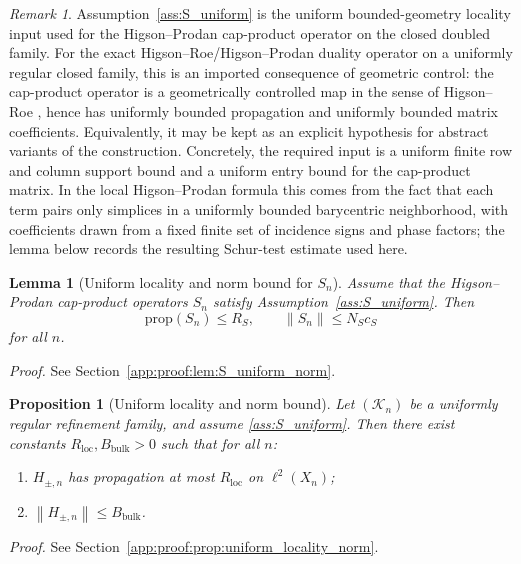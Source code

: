 \documentclass[11pt]{article}
\numberwithin{equation}{section}
\newtheorem{lemma}[theorem]{Lemma}
\newtheorem{proposition}[theorem]{Proposition}
\theoremstyle{definition}
\theoremstyle{remark}
\newtheorem{remark}[theorem]{Remark}
\newcommand{\proofref}[1]{%
  \par\noindent\emph{Proof.} See Section~\ref{#1}.\par\medskip
}
\newcommand{\proofappendixref}[1]{\proofref{#1}}
\newcommand{\K}{\mathcal{K}}
\newcommand{\opnorm}[1]{\left\lVert#1\right\rVert}
\begin{document}
\begin{remark}
Assumption~\ref{ass:S_uniform} is the uniform bounded-geometry locality input used for the
Higson--Prodan cap-product operator on the closed doubled family. For the exact
Higson--Roe/Higson--Prodan duality operator on a uniformly regular closed family, this is an
imported consequence of geometric control: the cap-product operator is a geometrically controlled
map in the sense of Higson--Roe \cite{HigsonRoeII}, hence has uniformly bounded propagation and
uniformly bounded matrix coefficients. Equivalently, it may be kept as an explicit hypothesis for
abstract variants of the construction. Concretely, the required input is a uniform finite row and
column support bound and a uniform entry bound for the cap-product matrix. In the local
Higson--Prodan formula this comes from the fact that each term pairs only simplices in a uniformly
bounded barycentric neighborhood, with coefficients drawn from a fixed finite set of incidence
signs and phase factors; the lemma below records the resulting Schur-test estimate used here.
\end{remark}

\begin{lemma}[Uniform locality and norm bound for \(S_n\)]\label{lem:S_uniform_norm}
Assume that the Higson--Prodan cap-product operators $S_n$ satisfy
Assumption~\ref{ass:S_uniform}. Then
\[
\mathrm{prop}(S_n)\le R_S,
\qquad
\opnorm{S_n}\le N_Sc_S
\]
for all $n$.
\end{lemma}
\proofappendixref{app:proof:lem:S_uniform_norm}




\begin{proposition}[Uniform locality and norm bound]\label{prop:uniform_locality_norm}
Let $(\K_n)$ be a uniformly regular refinement family, and assume
\ref{ass:S_uniform}. Then there exist constants
$R_{\mathrm{loc}},B_{\mathrm{bulk}}>0$ such that for all $n$:
\begin{enumerate}[label=(\alph*),leftmargin=2em]
\item $H_{\pm,n}$ has propagation at most $R_{\mathrm{loc}}$ on $\ell^2(X_n)$;
\item $\opnorm{H_{\pm,n}}\le B_{\mathrm{bulk}}$.
\end{enumerate}
\end{proposition}
\proofappendixref{app:proof:prop:uniform_locality_norm}
\end{document}
